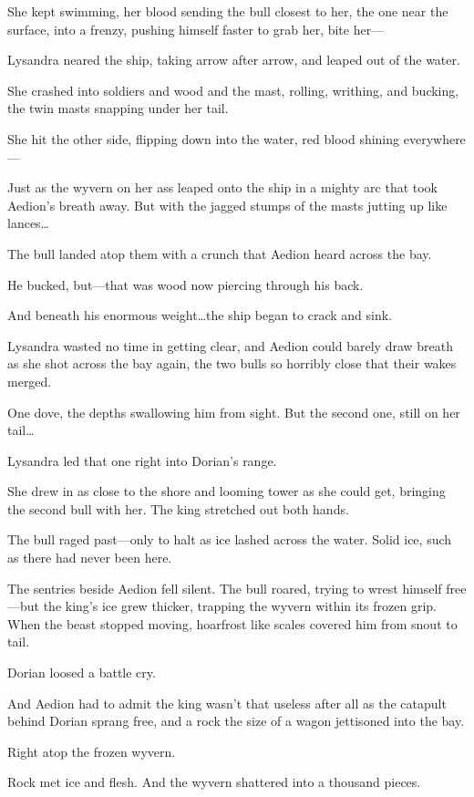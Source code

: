 She kept swimming, her blood sending the bull closest to her, the one near the surface, into a frenzy, pushing himself faster to grab her, bite her---

Lysandra neared the ship, taking arrow after arrow, and leaped out of the water.

She crashed into soldiers and wood and the mast, rolling, writhing, and bucking, the twin masts snapping under her tail.

She hit the other side, flipping down into the water, red blood shining everywhere---

Just as the wyvern on her ass leaped onto the ship in a mighty arc that took Aedion's breath away.
But with the jagged stumps of the masts jutting up like lances\ldots{}

The bull landed atop them with a crunch that Aedion heard across the bay.

He bucked, but---that was wood now piercing through his back.

And beneath his enormous weight\ldots the ship began to crack and sink.

Lysandra wasted no time in getting clear, and Aedion could barely draw breath as she shot across the bay again, the two bulls so horribly close that their wakes merged.

One dove, the depths swallowing him from sight.
But the second one, still on her tail\ldots{}

Lysandra led that one right into Dorian's range.

She drew in as close to the shore and looming tower as she could get, bringing the second bull with her.
The king stretched out both hands.

The bull raged past---only to halt as ice lashed across the water.
Solid ice, such as there had never been here.

The sentries beside Aedion fell silent.
The bull roared, trying to wrest himself free---but the king's ice grew thicker, trapping the wyvern within its frozen grip.
When the beast stopped moving, hoarfrost like scales covered him from snout to tail.

Dorian loosed a battle cry.

And Aedion had to admit the king wasn't that useless after all as the catapult behind Dorian sprang free, and a rock the size of a wagon jettisoned into the bay.

Right atop the frozen wyvern.

Rock met ice and flesh.
And the wyvern shattered into a thousand pieces.

